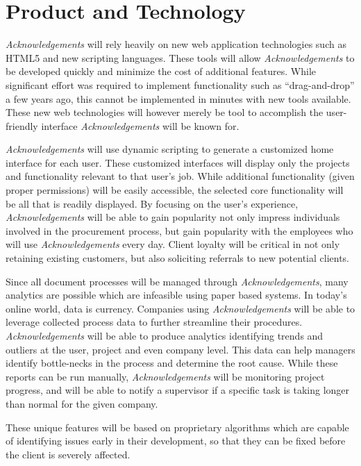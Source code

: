 \section{Product and Technology}
{\it Acknowledgements} will rely heavily on new web application technologies such as HTML5 and new scripting languages. These tools will allow {\it Acknowledgements} to be developed quickly and minimize the cost of additional features. While significant effort was required to implement functionality such as ``drag-and-drop'' a few years ago, this cannot be implemented in minutes with new tools available. These new web technologies will however merely be tool to accomplish the user-friendly interface {\it Acknowledgements} will be known for.

{\it Acknowledgements} will use dynamic scripting to generate a customized home interface for each user. These customized interfaces will display only the projects and functionality relevant to that user's job. While additional functionality (given proper permissions) will be easily accessible, the selected core functionality will be all that is readily displayed. By focusing on the user's experience, {\it Acknowledgements} will be able to gain popularity not only impress individuals involved in the procurement process, but gain popularity with the employees who will use {\it Acknowledgements} every day. Client loyalty will be critical in not only retaining existing customers, but also soliciting referrals to new potential clients.

Since all document processes will be managed through {\it Acknowledgements}, many analytics are possible which are infeasible using paper based systems. In today's online world, data is currency. Companies using {\it Acknowledgements} will be able to leverage collected process data to further streamline their procedures. {\it Acknowledgements} will be able to produce analytics identifying trends and outliers at the user, project and even company level. This data can help managers identify bottle-necks in the process and determine the root cause. While these reports can be run manually, {\it Acknowledgements} will be monitoring project progress, and will be able to notify a supervisor if a specific task is taking longer than normal for the given company.

These unique features will be based on proprietary algorithms which are capable of identifying issues early in their development, so that they can be fixed before the client is severely affected.